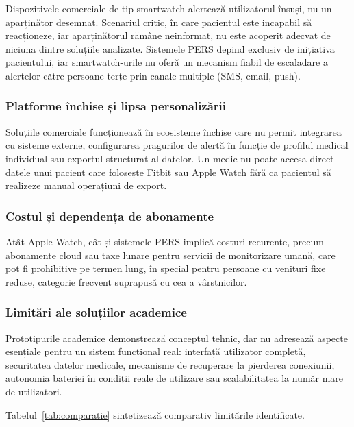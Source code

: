 \documentclass[12pt,a4paper]{article}
\begin{document}
Dispozitivele comerciale de tip smartwatch alertează utilizatorul însuși, nu un aparținător desemnat. Scenariul critic, în care pacientul este incapabil să reacționeze, iar aparținătorul rămâne neinformat, nu este acoperit adecvat de niciuna dintre soluțiile analizate. Sistemele PERS depind exclusiv de inițiativa pacientului, iar smartwatch-urile nu oferă un mecanism fiabil de escaladare a alertelor către persoane terțe prin canale multiple (SMS, email, push).

\subsubsection{Platforme închise și lipsa personalizării}

Soluțiile comerciale funcționează în ecosisteme închise care nu permit integrarea cu sisteme externe, configurarea pragurilor de alertă în funcție de profilul medical individual sau exportul structurat al datelor. Un medic nu poate accesa direct datele unui pacient care folosește Fitbit sau Apple Watch fără ca pacientul să realizeze manual operațiuni de export.

\subsubsection{Costul și dependența de abonamente}

Atât Apple Watch, cât și sistemele PERS implică costuri recurente, precum abonamente cloud sau taxe lunare pentru servicii de monitorizare umană, care pot fi prohibitive pe termen lung, în special pentru persoane cu venituri fixe reduse, categorie frecvent suprapusă cu cea a vârstnicilor.

\subsubsection{Limitări ale soluțiilor academice}

Prototipurile academice demonstrează conceptul tehnic, dar nu adresează aspecte esențiale pentru un sistem funcțional real: interfață utilizator completă, securitatea datelor medicale, mecanisme de recuperare la pierderea conexiunii, autonomia bateriei în condiții reale de utilizare sau scalabilitatea la număr mare de utilizatori.

Tabelul~\ref{tab:comparatie} sintetizează comparativ limitările identificate.
\end{document}
